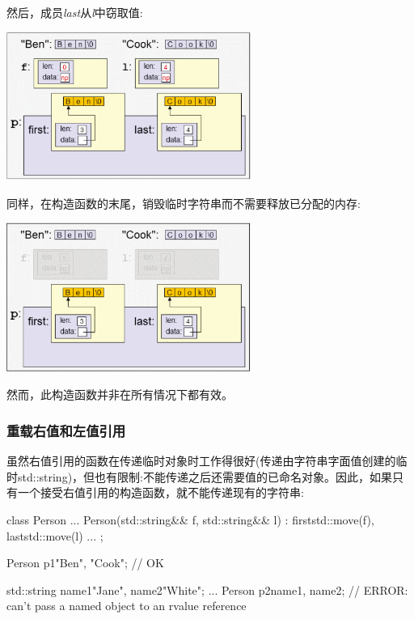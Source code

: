 然后，成员\textit{last}从\textit{l}中窃取值:

\begin{center}
	\includegraphics[width=0.6\textwidth]{part1/ch4/images/10}
\end{center}

同样，在构造函数的末尾，销毁临时字符串而不需要释放已分配的内存:

\begin{center}
	\includegraphics[width=0.6\textwidth]{part1/ch4/images/11}
\end{center}

然而，此构造函数并非在所有情况下都有效。

\subsubsection{重载右值和左值引用}

虽然右值引用的函数在传递临时对象时工作得很好(传递由字符串字面值创建的临时std::string)，但也有限制:不能传递之后还需要值的已命名对象。因此，如果只有一个接受右值引用的构造函数，就不能传递现有的字符串:

\begin{cppcode}
class Person {
	...
	Person(std::string&& f, std::string&& l)
	: first{std::move(f)}, last{std::move(l)} {
	}
	...
};

Person p1{"Ben", "Cook"}; // OK

std::string name1{"Jane"}, name2{"White"};
...
Person p2{name1, name2}; // ERROR: can’t pass a named object to an rvalue reference
\end{cppcode}


